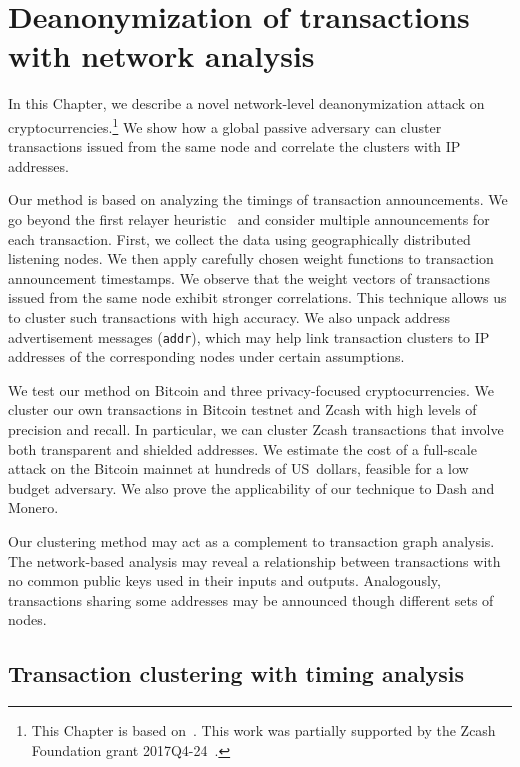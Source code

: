 \chapter{Deanonymization of transactions with network analysis}

\label{Chapter03Clustering}

In this Chapter, we describe a novel network-level deanonymization attack on cryptocurrencies.\footnote{This Chapter is based on~\cite{Biryukov2019a, Biryukov2019b}. This work was partially supported by the Zcash Foundation grant 2017Q4-24~\cite{Feher2017}.}
We show how a global passive adversary can cluster transactions issued from the same node and correlate the clusters with IP addresses.

Our method is based on analyzing the timings of transaction announcements.
We go beyond the first relayer heuristic~\cite{Biryukov2014, Koshy2014} and consider multiple announcements for each transaction.
First, we collect the data using geographically distributed listening nodes.
We then apply carefully chosen weight functions to transaction announcement timestamps.
We observe that the weight vectors of transactions issued from the same node exhibit stronger correlations.
This technique allows us to cluster such transactions with high accuracy.
We also unpack address advertisement messages (\texttt{addr}), which may help link transaction clusters to IP addresses of the corresponding nodes under certain assumptions.

We test our method on Bitcoin and three privacy-focused cryptocurrencies.
We cluster our own transactions in Bitcoin testnet and Zcash with high levels of precision and recall.
In particular, we can cluster Zcash transactions that involve both transparent and shielded addresses.
We estimate the cost of a full-scale attack on the Bitcoin mainnet at hundreds of US~dollars, feasible for a low budget adversary.
We also prove the applicability of our technique to Dash and Monero.

Our clustering method may act as a complement to transaction graph analysis.
The network-based analysis may reveal a relationship between transactions with no common public keys used in their inputs and outputs.
Analogously, transactions sharing some addresses may be announced though different sets of nodes.


\section{Transaction clustering with timing analysis}  \label{sec:Ch03Ourapproach}

